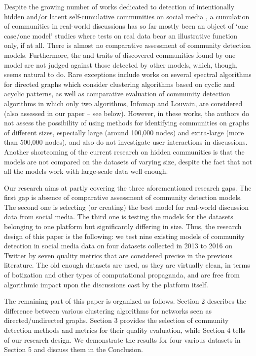 Despite the growing number of works dedicated to detection of intentionally hidden and/or latent self-cumulative communities on social media \cite{PerligerPedahzur,WangGongLiu}, a cumulation of communities in real-world discussions has so far mostly been an object of ‘one case/one model’ studies where tests on real data bear an illustrative function only, if at all. There is almost no comparative assessment of community detection models. Furthermore, the  and traits of discovered communities found by one model are not judged against those detected by other models, which, though, seems natural to do. Rare exceptions include works on several spectral algorithms for directed graphs \cite{VanLierdeDelvenneVanDooren} which consider clustering algorithms based on cyclic and acyclic patterns, as well as comparative evaluation of community detection algorithms \cite{GeorgeShujaeeKerwat} in which only two algorithms, Infomap and Louvain, are considered (also assessed in our paper -- see below). However, in these works, the authors do not assess the possibility of using methods for identifying communities on graphs of different sizes, especially large (around 100,000 nodes) and extra-large (more than 500,000 nodes), and also do not investigate user interactions in discussions. Another shortcoming of the current research on hidden communities is that the models are not compared on the datasets of varying size, despite the fact that not all the models work with large-scale data well enough.

Our research aims at partly covering the three aforementioned research gaps. The first gap is absence of comparative assessment of community detection models. The second one is selecting (or creating) the best model for real-world discussion data from social media. The third one is testing the models for the datasets belonging to one platform but significantly differing in size. Thus, the research design of this paper is the following: we test nine existing models of community detection in social media data on four datasets collected in 2013 to 2016 on Twitter by seven quality metrics that are considered precise in the previous literature. The old enough datasets are used, as they are virtually clean, in terms of botization and other types of computational propaganda, and are free from algorithmic impact upon the discussions cast by the platform itself.

The remaining part of this paper is organized as follows. Section 2 describes the difference between various clustering algorithms for networks seen as directed/undirected graphs. Section 3 provides the selection of community detection methods and metrics for their quality evaluation, while Section 4 tells of our research design. We demonstrate the results for four various datasets in Section 5 and discuss them in the Conclusion.

